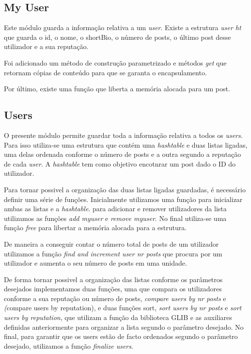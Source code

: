 \documentclass[a4paper]{article}
\begin{document}
\subsection{My User}

	Este módulo guarda a informação relativa a um \emph{user}. Existe a estrutura \emph{user ht} que guarda o id, o nome, o shortBio, o número de posts, o último post desse utilizador e a sua reputação.

	Foi adicionado um método de construção parametrizado e métodos \emph{get} que retornam cópias de conteúdo para que se garanta o encapsulamento.

	Por último, existe uma função que liberta a memória alocada para um post.

\subsection{Users}

	O presente módulo permite guardar toda a informação relativa a todos os \emph{users}. Para isso utiliza-se uma estrutura que contém uma \emph{hashtable} e duas listas ligadas, uma delas ordenada conforme o número de posts e a outra segundo a reputação de cada \emph{user}. A \emph{hashtable} tem como objetivo encotnrar um post dado o ID do utilizador.

	Para tornar possivel a organização das duas listas ligadas guardadas, é necessário definir uma série de funções. Inicialmente utilizamos uma função para inicializar ambas as listas e a \emph{hashtable}. para adicionar e remover utilizadores da lista utilizamos as funções \emph{add myuser} e \emph{remove myuser}. No final utiliza-se uma função \emph{free} para libertar a memória alocada para a estrutura.

	De maneira a conseguir contar o número total de posts de um utilizador utilizamos a função \emph{find and increment user nr posts} que procura por um utilizador e aumenta o seu número de posts em uma unidade.

	De forma tornar possivel a organização das listas conforme os parâmetros desejados implementamos duas funções, uma que compara os utilizadores conforme a sua reputação ou número de posts, \emph{compare users by nr posts} e \emph(compare users by reputation), e duas funções sort, \emph{sort users by nr posts} e \emph{sort users by reputation}, que utilizam a função da biblioteca GLIB e as auxiliares definidas anteriormente para organizar a lista segundo o parâmetro desejado. No final, para garantir que os users estão de facto ordenados segundo o parâmetro desejado, utilizamos a função \emph{finalize users}.
\end{document}
